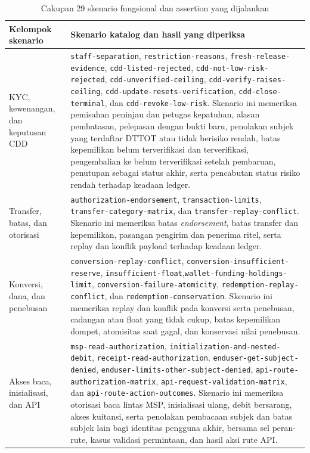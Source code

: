 \begingroup
\renewcommand{\arraystretch}{1.3}
\begin{table}[H]
	\caption{Cakupan 29 skenario fungsional dan assertion yang dijalankan}
	\label{tab:uji-fungsional}
	\centering
	\footnotesize
	\raggedright
	\begin{tabular}{p{3.1cm} p{9.6cm}}
	\toprule
	\textbf{Kelompok skenario} & \textbf{Skenario katalog dan hasil yang diperiksa} \\
	\midrule
	KYC, kewenangan, dan keputusan CDD & \texttt{staff-separation}, \allowbreak\texttt{restriction-reasons}, \allowbreak\texttt{fresh-release-evidence}, \allowbreak\texttt{cdd-listed-rejected}, \allowbreak\texttt{cdd-not-low-risk-rejected}, \allowbreak\texttt{cdd-unverified-ceiling}, \allowbreak\texttt{cdd-verify-raises-ceiling}, \allowbreak\texttt{cdd-update-resets-verification}, \allowbreak\texttt{cdd-close-terminal}, dan \texttt{cdd-revoke-low-risk}. Skenario ini memeriksa pemisahan peninjau dan petugas kepatuhan, alasan pembatasan, pelepasan dengan bukti baru, penolakan subjek yang terdaftar DTTOT atau tidak berisiko rendah, batas kepemilikan belum terverifikasi dan terverifikasi, pengembalian ke belum terverifikasi setelah pembaruan, penutupan sebagai status akhir, serta pencabutan status risiko rendah terhadap keadaan ledger. \\
	Transfer, batas, dan otorisasi & \texttt{authorization-endorsement}, \allowbreak\texttt{transaction-limits}, \allowbreak\texttt{transfer-category-matrix}, dan \texttt{transfer-replay-conflict}. Skenario ini memeriksa batas \textit{endorsement}, batas transfer dan kepemilikan, pasangan pengirim dan penerima ritel, serta replay dan konflik payload terhadap keadaan ledger. \\
	Konversi, dana, dan penebusan & \texttt{conversion-replay-conflict}, \allowbreak\texttt{conversion-insufficient-reserve}, \allowbreak\texttt{insufficient-float},\newline\texttt{wallet-funding-holdings-limit}, \allowbreak\texttt{conversion-failure-atomicity}, \allowbreak\texttt{redemption-replay-conflict}, dan \texttt{redemption-conservation}. Skenario ini memeriksa replay dan konflik pada konversi serta penebusan, cadangan atau float yang tidak cukup, batas kepemilikan dompet, atomisitas saat gagal, dan konservasi nilai penebusan. \\
	Akses baca, inisialisasi, dan API & \texttt{msp-read-authorization}, \allowbreak\texttt{initialization-and-nested-debit}, \allowbreak\texttt{receipt-read-authorization}, \allowbreak\texttt{enduser-get-subject-denied}, \allowbreak\texttt{enduser-limits-other-subject-denied}, \allowbreak\texttt{api-route-authorization-matrix}, \allowbreak\texttt{api-request-validation-matrix}, dan \texttt{api-route-action-outcomes}. Skenario ini memeriksa otorisasi baca lintas MSP, inisialisasi ulang, debit bersarang, akses kuitansi, serta penolakan pembacaan subjek dan batas subjek lain bagi identitas pengguna akhir, bersama sel peran-rute, kasus validasi permintaan, dan hasil aksi rute API. \\
	\bottomrule
	\end{tabular}
\end{table}
\endgroup

